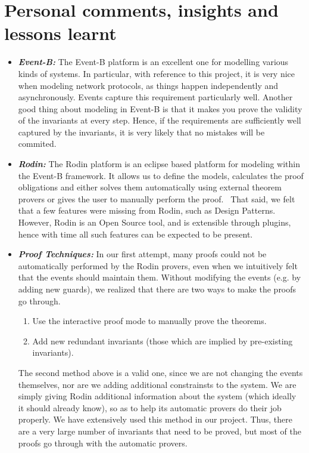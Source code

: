 \section{Personal comments, insights and lessons learnt}
\begin{itemize}
\item 
  \emph{\bf Event-B:} The Event-B platform is an excellent one for modelling various kinds of systems. In particular, with reference to this project, it is very nice 
  when modeling network protocols, as things happen independently and asynchronously. Events capture this requirement particularly well. Another good thing about modeling 
  in Event-B is that it makes you prove the validity of the invariants at every step. Hence, if the requirements are sufficiently well captured by the invariants, it is 
  very likely that no mistakes will be commited.
\item 
  \emph{\bf Rodin:} The Rodin platform is an eclipse based platform for modeling within the Event-B framework. It allows us to
  define the models, calculates the proof obligations and either solves them automatically using
  external theorem provers or gives the user to manually perform the proof.~\cite{JoachimVizing} That said, we felt that a few features were missing from Rodin, such as Design Patterns.
  However, Rodin is an Open Source tool, and is extensible through plugins, hence with time all such features can be expected to be present.
\item 
  \emph{\bf Proof Techniques:} In our first attempt, many proofs could not be automatically performed by the Rodin provers, even when we intuitively felt that the events 
  should maintain them. Without modifying the events (e.g. by adding new guards), we realized that there are two ways to make the proofs go through.
  \begin{enumerate}
  \item Use the interactive proof mode to manually prove the theorems.
  \item Add new redundant invariants (those which are implied by pre-existing invariants). 
  \end{enumerate}
  The second method above is a valid one, since we are not changing the events themselves, nor are we adding additional constrainsts to the system. We are simply giving 
  Rodin additional information about the system (which ideally it should already know), so as to help its automatic provers do their job properly. We have extensively used 
  this method in our project. Thus, there are a very large number of invariants that need to be proved, but most of the proofs go through with the automatic provers.  

\end{itemize}
